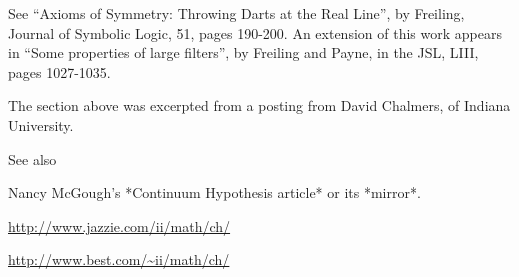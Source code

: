 See ``Axioms of Symmetry: Throwing Darts at the Real Line'', by
Freiling, Journal of Symbolic Logic, 51, pages 190-200.  An extension of
this work appears in ``Some properties of large filters'', by Freiling
and Payne, in the JSL, LIII, pages 1027-1035.

The section above was excerpted from a posting from David Chalmers, of
Indiana University.

See also

Nancy McGough's *Continuum Hypothesis article* or its *mirror*.

\url{http://www.jazzie.com/ii/math/ch/}

\url{http://www.best.com/~ii/math/ch/}
